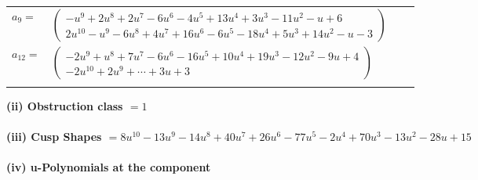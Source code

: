 \documentclass[1p]{elsarticle_modified}
\theoremstyle{definition}
\begin{document}
\begin{tabular}{m{7pt} m{180pt} m{7pt} m{180pt} }
\flushright $a_{9}=$&$\begin{pmatrix}- u^9+2 u^8+2 u^7-6 u^6-4 u^5+13 u^4+3 u^3-11 u^2- u+6\\2 u^{10}- u^9-6 u^8+4 u^7+16 u^6-6 u^5-18 u^4+5 u^3+14 u^2- u-3\end{pmatrix}$ \\
\flushright $a_{12}=$&$\begin{pmatrix}-2 u^9+u^8+7 u^7-6 u^6-16 u^5+10 u^4+19 u^3-12 u^2-9 u+4\\-2 u^{10}+2 u^9+\cdots+3 u+3\end{pmatrix}$\\&\end{tabular}
\flushleft \textbf{(ii) Obstruction class $= 1$}\\~\\
\flushleft \textbf{(iii) Cusp Shapes $= 8 u^{10}-13 u^9-14 u^8+40 u^7+26 u^6-77 u^5-2 u^4+70 u^3-13 u^2-28 u+15$}\\~\\
\newpage\renewcommand{\arraystretch}{1}
\flushleft \textbf{(iv) u-Polynomials at the component}\newline \\
\end{document}
